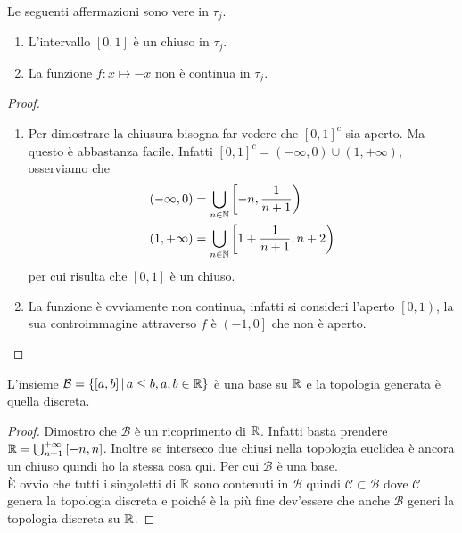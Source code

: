 \begin{theorem}
	Le seguenti affermazioni sono vere in $\tau_j$.
	\begin{enumerate}
		\item L'intervallo $\left[0,1\right]$ è un chiuso in $\tau_j$. 
		\item La funzione $f \colon x \mapsto -x$ non è continua in $\tau_j$.
	\end{enumerate}
\end{theorem}
\begin{proof}\
	\begin{enumerate}
		\item Per dimostrare la chiusura bisogna far vedere che $\left[0,1\right]^c$ sia aperto. Ma questo è abbastanza facile. Infatti $\left[0,1\right]^c = \left(-\infty, 0\right) \cup \left(1, +\infty\right)$, osserviamo che 
		\begin{align*}
			\left(-\infty, 0\right) & = \bigcup_{n \in \mathbb{N}} \left[-n, \frac{1}{n+1}\right) \\	
			\left(1, +\infty\right) & = \bigcup_{n \in \mathbb{N}} \left[1+\frac{1}{n+1}, n+2\right)\\
		\end{align*}
		per cui risulta che $\left[0,1\right]$ è un chiuso.
		\item La funzione è ovviamente non continua, infatti si consideri l'aperto $\left[0,1\right)$, la sua controimmagine attraverso $f$ è $\left(-1, 0\right]$ che non è aperto.
	\end{enumerate}
\end{proof}

\begin{theorem}
	L'insieme $\mathcal{B} = \left\{ \left[a, b\right] \,\middle|\, a \le b, a, b \in \mathbb{R} \right\}$ è una base su $\mathbb{R}$ e la topologia generata è quella discreta. 
\end{theorem}
\begin{proof}
	Dimostro che $\mathcal{B}$ è un ricoprimento di $\mathbb{R}$. Infatti basta prendere $\mathbb{R} = \bigcup^{+\infty}_{n=1} \left[-n, n\right]$. Inoltre se interseco due chiusi nella topologia euclidea è ancora un chiuso quindi ho la stessa cosa qui. Per cui $\mathcal{B}$ è una base. \\ 
	
	È ovvio che tutti i singoletti di $\mathbb{R}$ sono contenuti in $\mathcal{B}$ quindi $\mathcal{C}\subset \mathcal{B}$ dove $\mathcal{C}$ genera la topologia discreta e poiché è la più fine dev'essere che anche $\mathcal{B}$ generi la topologia discreta su $\mathbb{R}$.
\end{proof}



